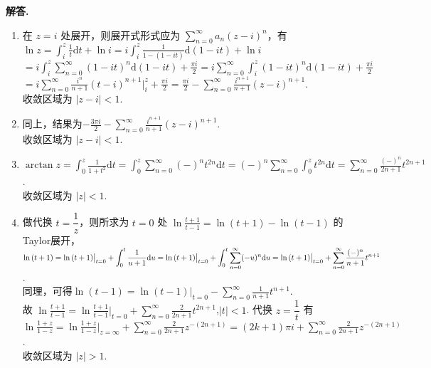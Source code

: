 \documentclass[11pt]{ctexart}
\newenvironment{solution}{\par\noindent\textbf{解答. }}{\par}
\begin{document}
\begin{solution}
    \begin{enumerate}[(1)]
        \item 在 $z=i$ 处展开，则展开式形式应为 $\displaystyle\sum_{n=0}^{\infty}a_n(z-i)^n$，有\\[12pt]
                $\displaystyle\ln{z} = \int_{i}^{z}\frac{1}{t}\text{d}t + \ln{i} 
                = i\int_{i}^{z}\frac{1}{1-(1-it)}\text{d}(1-it) + \ln{i}$ \\[12pt]
                $= \displaystyle i\int_{i}^{z}\sum_{n=0}^{\infty}(1-it)^n\text{d}(1-it) + \frac{\pi i}{2}  
                =i\sum_{n=0}^{\infty}\int_{i}^{z}(1-it)^n\text{d}(1-it) + \frac{\pi i}{2}$ \\[12pt]
                $= \displaystyle i\sum_{n=0}^{\infty}\frac{i^n}{n+1}(t-i)^{n+1}\bigg|_{i}^{z} + \frac{\pi i}{2} 
                = \frac{\pi i}{2} - \sum_{n=0}^{\infty}\frac{i^{n+1}}{n+1}(z-i)^{n+1}$.\\[12pt]
              收敛区域为 $\left|z-i\right|<1$.
        \item 同上，结果为$\displaystyle -\frac{3\pi i}{2} - \sum_{n=0}^{\infty}\frac{i^{n+1}}{n+1}(z-i)^{n+1}$.\\[12pt]
              收敛区域为 $\left|z-i\right|<1$.
        \item $\displaystyle\arctan{z} = \int_{0}^{z}\frac{1}{1+t^2}\text{d}t 
              = \int_{0}^{z}\sum_{n=0}^{\infty}(-)^nt^{2n}\text{d}t 
              = (-)^n\sum_{n=0}^{\infty}\int_{0}^{z}t^{2n}\text{d}t
              = \sum_{n=0}^{\infty}\frac{(-)^n}{2n+1}t^{2n+1}$.\\[12pt]
              收敛区域为 $\left|z\right|<1$.
        \item 做代换 $t = \dfrac{1}{z}$，则所求为 $t=0$ 处 $\displaystyle\ln{\frac{t+1}{t-1}} = \ln{(t+1) - \ln{(t-1)}}$ 的Taylor展开，\\[12pt]
              $\displaystyle\ln{(t+1)} = \ln{(t+1)}\big|_{t=0} + \int_0^t\frac{1}{u+1}\text{d}u = \ln{(t+1)}\big|_{t=0} + \int_0^t\sum_{n=0}^{\infty}(-u)^n\text{d}u \\[12pt]
              = \ln{(t+1)}\big|_{t=0} + \sum_{n=0}^{\infty}\frac{(-)^n}{n+1}t^{n+1}$. \\[12pt]
              同理，可得$\displaystyle\ln{(t-1)}= \ln{(t-1)}\big|_{t=0} - \sum_{n=0}^{\infty}\frac{1}{n+1}t^{n+1}$.\\[12pt]
              故 $\displaystyle\ln{\frac{t+1}{t-1}} = \ln{\frac{t+1}{t-1}}\Big|_{t=0} + \sum_{n=0}^{\infty}\frac{2}{2n+1}t^{2n+1}$,$\left|t\right|<1$.
              代换 $z=\dfrac{1}{t}$ 有 \\[12pt]
              $\displaystyle\ln{\frac{1+z}{1-z}} = \ln{\frac{1+z}{1-z}}\Big|_{z=\infty} + \sum_{n=0}^{\infty}\frac{2}{2n+1}z^{-(2n+1)} 
              = (2k+1)\pi i + \sum_{n=0}^{\infty}\frac{2}{2n+1}z^{-(2n+1)}$.\\[12pt]
              收敛区域为 $\left|z\right|>1$.
    \end{enumerate}
\end{solution}
\end{document}

